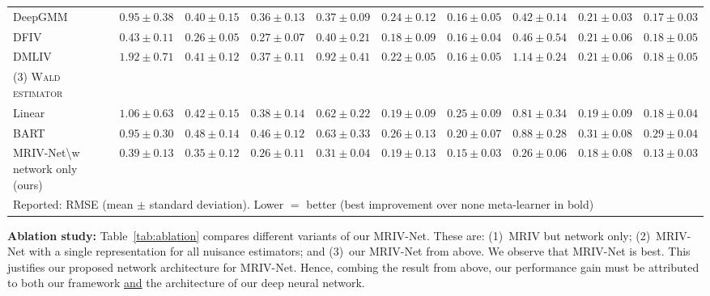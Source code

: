 \documentclass[nonatbib]{article}
\newcommand{\frameworkname}{MRIV\xspace}
\newcommand{\modelname}{\mbox{MRIV-Net}\xspace}
\theoremstyle{definition}
\theoremstyle{plain}
\begin{document}
\begin{table}[tbp]
{\begin{tabular}{lccccccccc}
\quad DeepGMM \cite{Bennett.2019}&$0.95 \pm 0.38$ & $0.40 \pm 0.15$& $\boldsymbol{0.36 \pm 0.13}$ &$0.37 \pm 0.09$ & $0.24 \pm 0.12$ & $\boldsymbol{0.16 \pm 0.05}$ &$0.42 \pm 0.14$ & $0.21 \pm 0.03$ & $\boldsymbol{0.17 \pm 0.03}$ \\
\quad DFIV \cite{Xu.2021}&$0.43 \pm 0.11$ &$\boldsymbol{0.26 \pm 0.05}$ & $0.27 \pm 0.07$ &$0.40 \pm 0.21$ & $0.18 \pm 0.09$ & $\boldsymbol{0.16 \pm 0.04}$ &$0.46 \pm 0.54$ & $0.21 \pm 0.06$ & $\boldsymbol{0.18 \pm 0.05}$ \\
\quad DMLIV \cite{Syrgkanis.2019}&$1.92 \pm 0.71$ &$0.41 \pm 0.12$ & $\boldsymbol{0.37 \pm 0.11}$ &$0.92 \pm 0.41$ & $0.22 \pm 0.05$ & $\boldsymbol{0.16 \pm 0.05}$ &$1.14 \pm 0.24$ & $0.21 \pm 0.06$& $\boldsymbol{0.18 \pm 0.05}$\\
\midrule
\textsc{(3) Wald estimator \cite{Wald.1940}}& & & & &  & \\
\quad Linear &$1.06 \pm 0.63$ & $0.42 \pm 0.15$& $\boldsymbol{0.38 \pm 0.14}$ &$0.62 \pm 0.22$ &  $\boldsymbol{0.19 \pm 0.09}$ & $0.25 \pm 0.09$ &$0.81 \pm 0.34$ & $0.19 \pm 0.09$ & $\boldsymbol{0.18 \pm 0.04}$\\
\quad BART &$0.95 \pm 0.30$ &$0.48 \pm 0.14$ & $\boldsymbol{0.46 \pm 0.12}$ &$0.63 \pm 0.33$ & $0.26 \pm 0.13$ & $\boldsymbol{0.20 \pm 0.07}$ &$0.88 \pm 0.28$ & $0.31 \pm 0.08$ & $\boldsymbol{0.29 \pm 0.04}$\\
\midrule
\modelname {\textbackslash}w network only (ours) &$0.39 \pm 0.13$ &$0.35 \pm 0.12$ & $\boldsymbol{0.26 \pm 0.11}$ & $0.31 \pm 0.04$& $0.19 \pm 0.13$ & $\boldsymbol{0.15 \pm 0.03}$ & $0.26 \pm 0.06$& $0.18 \pm 0.08$&  $\boldsymbol{0.13 \pm 0.03}$\\

\bottomrule
\multicolumn{10}{l}{Reported: RMSE (mean $\pm$ standard deviation). Lower $=$ better (best improvement over none meta-learner in bold)}
\end{tabular}%
}
\vspace{-0.3cm}
\end{table}

\textbf{Ablation study:} Table~\ref{tab:ablation} compares different variants of our \modelname. These are: (1)~\frameworkname but network only; (2)~\modelname with a single representation for all nuisance estimators; and (3)~our \modelname from above. We observe that \modelname is best. This justifies our proposed network architecture for \modelname. Hence, combing the result from above, our performance gain must be attributed to both our framework \underline{and} the architecture of our deep neural network. 
\end{document}

